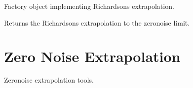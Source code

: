 \documentclass[letterpaper,10pt,english]{sphinxmanual}
\begin{document}
\begin{fulllineitems}
\label{\detokenize{index:mitiq.factories.RichardsonFactory}}
Factory object implementing Richardson\textquotesingle{}s extrapolation.

\begin{fulllineitems}
\label{\detokenize{index:mitiq.factories.RichardsonFactory.reduce}}
Returns the Richardson\textquotesingle{}s extrapolation to the zero\sphinxhyphen{}noise limit.

\end{fulllineitems}


\end{fulllineitems}



\section{Zero Noise Extrapolation}
\label{\detokenize{index:module-mitiq.zne}}\label{\detokenize{index:zero-noise-extrapolation}}
Zero\sphinxhyphen{}noise extrapolation tools.
\end{document}
